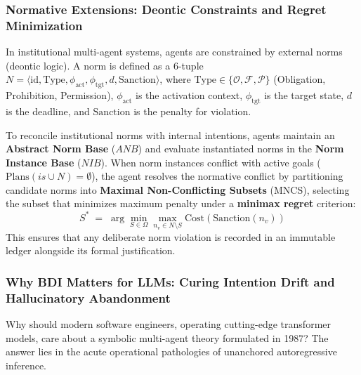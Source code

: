 \subsubsection{Normative Extensions: Deontic Constraints and Regret Minimization}

In institutional multi-agent systems, agents are constrained by external norms (deontic logic). A norm is defined as a 6-tuple $N = \langle \mathrm{id}, \mathrm{Type}, \phi_{\text{act}}, \phi_{\text{tgt}}, d, \mathrm{Sanction} \rangle$, where $\mathrm{Type} \in \{\mathcal{O}, \mathcal{F}, \mathcal{P}\}$ (Obligation, Prohibition, Permission), $\phi_{\text{act}}$ is the activation context, $\phi_{\text{tgt}}$ is the target state, $d$ is the deadline, and $\mathrm{Sanction}$ is the penalty for violation.

To reconcile institutional norms with internal intentions, agents maintain an \textbf{Abstract Norm Base} ($ANB$) and evaluate instantiated norms in the \textbf{Norm Instance Base} ($NIB$). When norm instances conflict with active goals ($\mathrm{Plans}(is \cup N) = \emptyset$), the agent resolves the normative conflict by partitioning candidate norms into \textbf{Maximal Non-Conflicting Subsets} (MNCS), selecting the subset that minimizes maximum penalty under a \textbf{minimax regret} criterion:
\begin{equation}
S^* \;=\; \arg\min_{S \in \Omega} \max_{n_v \in N \setminus S} \mathrm{Cost}(\mathrm{Sanction}(n_v))
\end{equation}
This ensures that any deliberate norm violation is recorded in an immutable ledger alongside its formal justification.

\subsubsection{Why BDI Matters for LLMs: Curing Intention Drift and Hallucinatory Abandonment}
\label{sec:why-bdi-matters}

Why should modern software engineers, operating cutting-edge transformer models, care about a symbolic multi-agent theory formulated in 1987? The answer lies in the acute operational pathologies of unanchored autoregressive inference.


